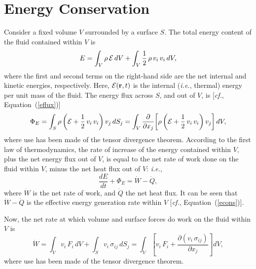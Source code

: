 \section{Energy Conservation}
Consider a fixed volume $V$ surrounded by a surface $S$. The total energy content of the fluid contained within $V$ is
\begin{equation}\label{e4.62}
E = \int_V \rho\,{\cal E}\,dV + \int_V\frac{1}{2}\,\rho\,v_i\,v_i\,dV,
\end{equation}
where the first and second terms on the right-hand side are the net internal and kinetic energies, respectively. Here, 
${\cal E}({\bf r},t)$ is the internal ({\em i.e.}, thermal) energy per unit mass of the fluid. The energy flux
across $S$, and out of $V$, is [{\em cf.},  Equation~(\ref{eflux})]
\begin{equation}\label{e4.63}
\Phi_E = \int_S \rho\left({\cal E} + \frac{1}{2}\,v_i\,v_i\right)v_j\,dS_j = \int_V\frac{\partial}{\partial x_j}\!
\left[\rho\left({\cal E} + \frac{1}{2}\,v_i\,v_i\right)v_j\right]dV,
\end{equation}
where use has been made of the tensor divergence theorem. According to the first law of thermodynamics, the rate of increase of
the energy contained within $V$, plus the net energy flux out of $V$, is equal to the net rate of work done on the fluid
within $V$, minus the
net  heat flux out of $V$: {\em i.e.},
\begin{equation}
\frac{dE}{dt} + \Phi_E = \dot{W} -\dot{Q},
\end{equation}
where $\dot{W}$ is the net rate of work, and $\dot{Q}$  the net heat flux. It can be seen that $\dot{W}-\dot{Q}$ is the
effective energy generation rate within $V$ [{\em cf.}, Equation~(\ref{econs})]. 

Now, the net rate at which volume and surface forces do work on the fluid within $V$ is
\begin{equation}\label{e4.65}
\dot{W} = \int_V v_i\,F_i\,dV + \int_S v_i\,\sigma_{ij}\,dS_j = \int_V\left[v_i\,F_i+ \frac{\partial(v_i\,\sigma_{ij})}{\partial x_j}\right]dV,
\end{equation}
where use has been made of the tensor divergence theorem.

